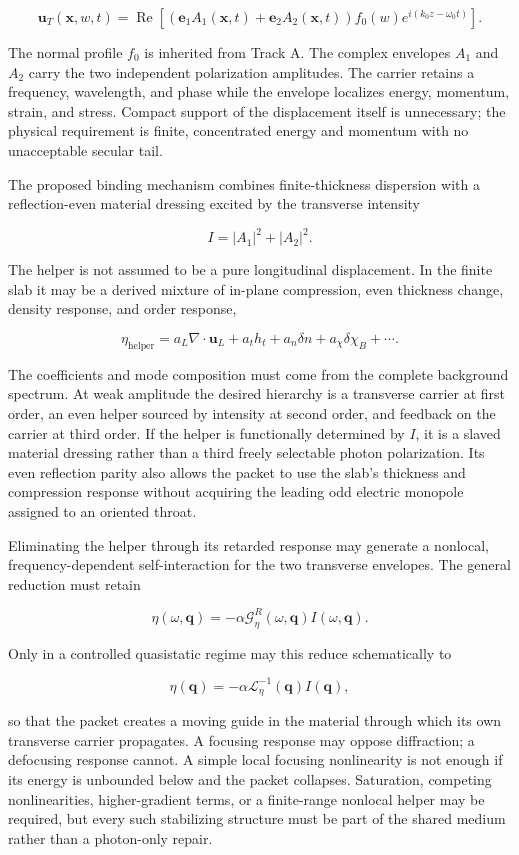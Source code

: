 \[
\mathbf u_T(\mathbf x,w,t)
=
\operatorname{Re}\!\left[
\left(
\mathbf e_1A_1(\mathbf x,t)
+
\mathbf e_2A_2(\mathbf x,t)
\right)
 f_0(w)
 e^{i(k_0z-\omega_0t)}
\right].
\]

The normal profile \(f_0\) is inherited from Track A. The complex envelopes
\(A_1\) and \(A_2\) carry the two independent polarization amplitudes. The
carrier retains a frequency, wavelength, and phase while the envelope localizes
energy, momentum, strain, and stress. Compact support of the displacement itself
is unnecessary; the physical requirement is finite, concentrated energy and
momentum with no unacceptable secular tail.

The proposed binding mechanism combines finite-thickness dispersion with a
reflection-even material dressing excited by the transverse intensity

\[
I=|A_1|^2+|A_2|^2.
\]

The helper is not assumed to be a pure longitudinal displacement. In the finite
slab it may be a derived mixture of in-plane compression, even thickness
change, density response, and order response,

\[
\eta_{\mathrm{helper}}
=
a_L\nabla\!\cdot\!\mathbf u_L
+a_t h_t
+a_n\delta n
+a_\chi\delta\chi_B
+\cdots.
\]

The coefficients and mode composition must come from the complete background
spectrum. At weak amplitude the desired hierarchy is a transverse carrier at
first order, an even helper sourced by intensity at second order, and feedback
on the carrier at third order. If the helper is functionally determined by
\(I\), it is a slaved material dressing rather than a third freely selectable
photon polarization. Its even reflection parity also allows the packet to use
the slab's thickness and compression response without acquiring the leading
odd electric monopole assigned to an oriented throat.

Eliminating the helper through its retarded response may generate a nonlocal,
frequency-dependent self-interaction for the two transverse envelopes. The
general reduction must retain

\[
\eta(\omega,\mathbf q)
=-\alpha\mathcal G_\eta^R(\omega,\mathbf q)I(\omega,\mathbf q).
\]

Only in a controlled quasistatic regime may this reduce schematically to

\[
\eta(\mathbf q)
=-\alpha\mathcal L_\eta^{-1}(\mathbf q)I(\mathbf q),
\]

so that the packet creates a moving guide in the material through which its own
transverse carrier propagates. A focusing response may oppose diffraction; a
defocusing response cannot. A simple local focusing nonlinearity is not enough
if its energy is unbounded below and the packet collapses. Saturation,
competing nonlinearities, higher-gradient terms, or a finite-range nonlocal
helper may be required, but every such stabilizing structure must be part of the
shared medium rather than a photon-only repair.

